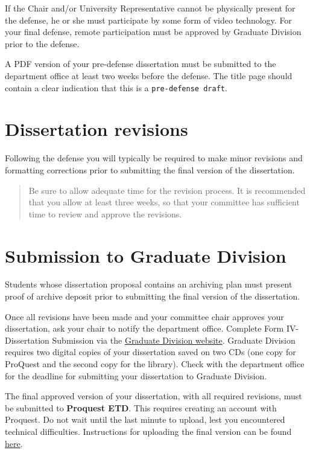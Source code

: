 \documentclass[
]{book}
\begin{document}
If the Chair and/or University Representative cannot be physically present for the defense, he or she must participate by some form of video technology. For your final defense, remote participation must be approved by Graduate Division prior to the defense.

A PDF version of your pre-defense dissertation must be submitted to the department office at least two weeks before the defense. The title page should contain a clear indication that this is a \texttt{pre-defense\ draft}.

\section{Dissertation revisions}\label{dissertation-revisions}

Following the defense you will typically be required to make minor revisions and formatting corrections prior to submitting the final version of the dissertation.

\begin{quote}
Be sure to allow adequate time for the revision process. It is recommended that you allow at least three weeks, so that your committee has sufficient time to review and approve the revisions.
\end{quote}

\section{Submission to Graduate Division}\label{submission-to-graduate-division}

Students whose dissertation proposal contains an \label{archiving}{archiving plan} must present proof of archive deposit prior to submitting the final version of the dissertation.

Once all revisions have been made and your committee chair approves your dissertation, ask your chair to notify the department office. Complete Form IV-Dissertation Submission via the \href{https://manoa.hawaii.edu/graduate/forms/}{Graduate Division website}. Graduate Division requires two digital copies of your dissertation saved on two CDs (one copy for ProQuest and the second copy for the library). Check with the department office for the deadline for submitting your dissertation to Graduate Division.

The final approved version of your dissertation, with all required revisions, must be submitted to \textbf{Proquest ETD}. This requires creating an account with Proquest. Do not wait until the last minute to upload, lest you encountered technical difficulties. Instructions for uploading the final version can be found \href{https://manoa.hawaii.edu/graduate/proquest-etd-submission-publication/}{here}.
\end{document}
